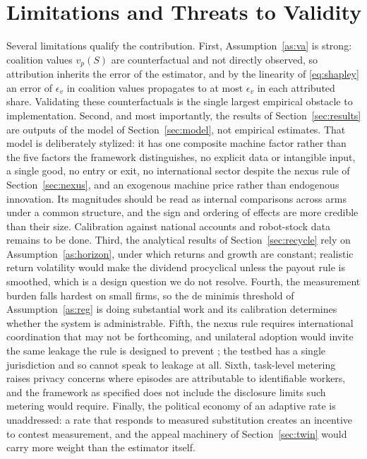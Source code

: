\documentclass[journal]{IEEEtran}
\theoremstyle{plain}
\theoremstyle{definition}
\begin{document}
\section{Limitations and Threats to Validity}
\label{sec:limitations}

Several limitations qualify the contribution. First, Assumption~\ref{as:va} is strong: coalition values $v_p(S)$ are counterfactual and not directly observed, so attribution inherits the error of the estimator, and by the linearity of \eqref{eq:shapley} an error of $\epsilon_v$ in coalition values propagates to at most $\epsilon_v$ in each attributed share. Validating these counterfactuals is the single largest empirical obstacle to implementation. Second, and most importantly, the results of Section~\ref{sec:results} are outputs of the model of Section~\ref{sec:model}, not empirical estimates. That model is deliberately stylized: it has one composite machine factor rather than the five factors the framework distinguishes, no explicit data or intangible input, a single good, no entry or exit, no international sector despite the nexus rule of Section~\ref{sec:nexus}, and an exogenous machine price rather than endogenous innovation. Its magnitudes should be read as internal comparisons across arms under a common structure, and the sign and ordering of effects are more credible than their size. Calibration against national accounts and robot-stock data remains to be done. Third, the analytical results of Section~\ref{sec:recycle} rely on Assumption~\ref{as:horizon}, under which returns and growth are constant; realistic return volatility would make the dividend procyclical unless the payout rule is smoothed, which is a design question we do not resolve. Fourth, the measurement burden falls hardest on small firms, so the de minimis threshold of Assumption~\ref{as:reg} is doing substantial work and its calibration determines whether the system is administrable. Fifth, the nexus rule requires international coordination that may not be forthcoming, and unilateral adoption would invite the same leakage the rule is designed to prevent \cite{OECDTwoPillar2021}; the testbed has a single jurisdiction and so cannot speak to leakage at all. Sixth, task-level metering raises privacy concerns where episodes are attributable to identifiable workers, and the framework as specified does not include the disclosure limits such metering would require. Finally, the political economy of an adaptive rate is unaddressed: a rate that responds to measured substitution creates an incentive to contest measurement, and the appeal machinery of Section~\ref{sec:twin} would carry more weight than the estimator itself.
\end{document}
